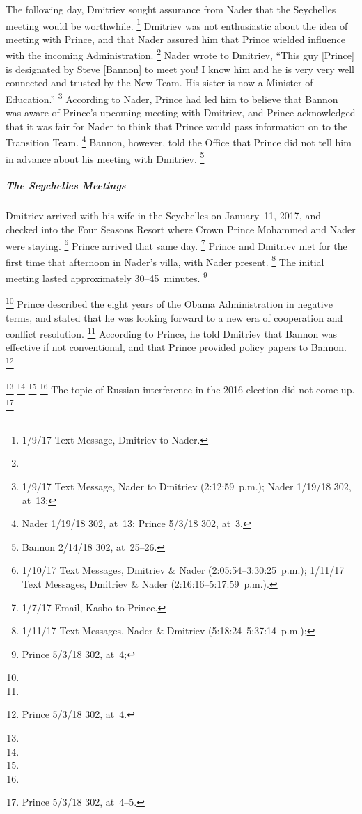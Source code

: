 The following day, Dmitriev sought assurance from Nader that the Seychelles meeting would be worthwhile.%
\footnote{1/9/17 Text Message, Dmitriev to Nader.}
Dmitriev was not enthusiastic about the idea of meeting with Prince, and that Nader assured him that Prince wielded influence with the incoming Administration.%
\footnote{}
Nader wrote to Dmitriev, ``This guy [Prince] is designated by Steve [Bannon] to meet you!
I know him and he is very very well connected and trusted by the New Team.
His sister is now a Minister of Education.''%
\footnote{1/9/17 Text Message, Nader to Dmitriev (2:12:59~p.m.);
Nader 1/19/18 302, at~13;
}
According to Nader, Prince had led him to believe that Bannon was aware of Prince's upcoming meeting with Dmitriev, and Prince acknowledged that it was fair for Nader to think that Prince would pass information on to the Transition Team.%
\footnote{Nader 1/19/18 302, at~13;  Prince 5/3/18 302, at~3.}
Bannon, however, told the Office that Prince did not tell him in advance about his meeting with Dmitriev.%
\footnote{Bannon 2/14/18 302, at~25--26.}

\subparagraph{The Seychelles Meetings}

Dmitriev arrived with his wife in the Seychelles on January~11, 2017, and checked into the Four Seasons Resort where Crown Prince Mohammed and Nader were staying.%
\footnote{1/10/17 Text Messages, Dmitriev \& Nader (2:05:54--3:30:25~p.m.);
1/11/17 Text Messages, Dmitriev \& Nader (2:16:16--5:17:59~p.m.).}
Prince arrived that same day.%
\footnote{1/7/17 Email, Kasbo to Prince.}
Prince and Dmitriev met for the first time that afternoon in Nader's villa, with Nader present.%
\footnote{1/11/17 Text Messages, Nader \& Dmitriev (5:18:24--5:37:14~p.m.);
}
The initial meeting lasted approximately 30--45~minutes.%
\footnote{Prince 5/3/18 302, at~4; }

\footnote{}
Prince described the eight years of the Obama Administration in negative terms, and stated that he was looking forward to a new era of cooperation and conflict resolution.%
\footnote{}
According to Prince, he told Dmitriev that Bannon was effective if not conventional, and that Prince provided policy papers to Bannon.%
\footnote{Prince 5/3/18 302, at~4.}

\footnote{}
\footnote{}
\footnote{}
\footnote{}
The topic of Russian interference in the 2016 election did not come up.%
\footnote{Prince 5/3/18 302, at~4--5.}

